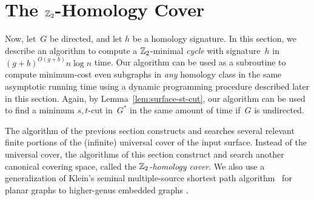 \section{The $\mathbb{Z}_2$-Homology Cover}
\label{sec:homcover}

Now, let~$G$ be directed, and let $h$
be a homology signature.  In this section, we describe an
algorithm to compute a $\mathbb{Z}_2$-minimal \emph{cycle} with signature~$h$
in $(g+b)^{O(g+b)}n \log n$ time. Our algorithm can be
used as a subroutine to compute minimum-cost even subgraphs in
\emph{any} homology class in the same asymptotic running time
using a dynamic programming procedure described later in this section.
Again, by Lemma~\ref{lem:surface-st-cut}, our algorithm can be used to find a minimum $s,t$-cut in~$G^*$ in the same amount of time if~$G$ is undirected.

The algorithm of the previous section constructs and searches several relevant finite portions of the (infinite) universal cover of the input surface.
Instead of the universal cover, the algorithms of this section construct and search another canonical covering space, called the \emph{$\mathbb{Z}_2$-homology cover}.
We also use a generalization of Klein's seminal multiple-source shortest path algorithm~\cite{k-msspp-05} for planar graphs to higher-genus embedded graphs \cite{cce-msspe-13}.

